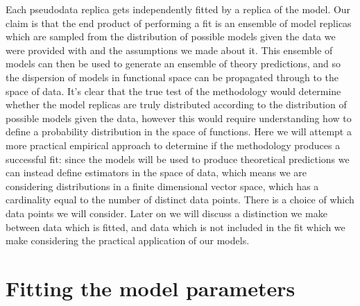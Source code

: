 Each pseudodata replica gets independently fitted by a replica of the model.
Our claim is that the end product of performing a fit is an ensemble of model
replicas which are sampled from the distribution of possible models given the
data we were provided
with and the assumptions we made about it. This ensemble of models can then
be used to generate an ensemble of theory predictions, and so the dispersion
of models in functional space can be propagated through to the space of data.
It's clear that the true test of the methodology would determine whether the
model replicas are truly distributed according to the distribution of possible
models given the data, however this would require understanding how to define
a probability distribution in the space of functions. Here we will attempt a
more practical empirical approach to determine if the methodology produces a
successful fit: since the models will be used to produce theoretical predictions
we can instead define estimators in the space of data, which means we are
considering distributions in a finite dimensional vector space, which has a
cardinality equal to the number of distinct data points. There is a choice
of which data points we will consider. Later on we will discuss a distinction
we make between data which is fitted, and data which is not included in the fit
which we make considering the practical application of our models.

\section{Fitting the model parameters}

